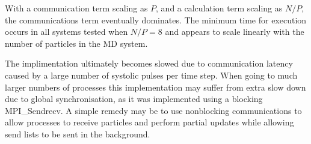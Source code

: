 With a communication term scaling as $P$, and a calculation term
scaling as $N/P$, the communications term eventually dominates.
%
The minimum time for execution occurs in all systems tested when $N/P = 8$
and appears to scale linearly with the number of particles in the MD system.

The implimentation ultimately becomes slowed due to
communication latency caused by a large number
of systolic pulses per time step.
%
When going to much larger numbers of processes
this implementation may suffer from extra slow down due to
global synchronisation, as it was implemented using a blocking
MPI\_Sendrecv.
%
A simple remedy may be to use nonblocking communications to allow
processes to receive particles and perform partial updates while
allowing send lists to be sent in the background.
